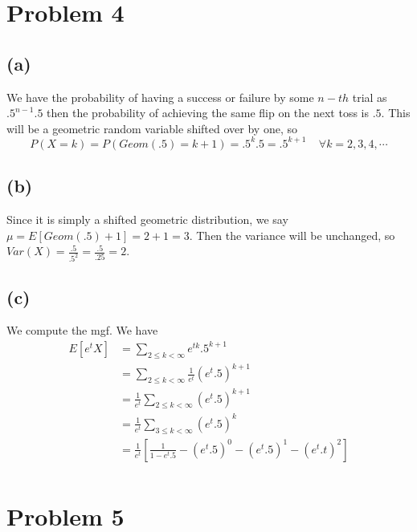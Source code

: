 \documentclass{article}
\theoremstyle{definition}
\begin{document}
\section*{Problem 4}
\subsection*{(a)}
We have the probability of having a success or failure by some $n-th$ trial as $.5^{n-1}.5$ then the probability of achieving the same flip on the next toss is $.5$. This will be a geometric random variable shifted over by one, so 
\[
    P(X = k) = P(Geom(.5) = k + 1) = .5^{k} .5 = .5^{k+1} \ \ \ \ \ \forall k = 2,3,4,\cdots
\]
\subsection*{(b)}
Since it is simply a shifted geometric distribution, we say $\mu = E[Geom(.5) + 1] = 2 + 1 = 3$.
Then the variance will be unchanged, so $Var(X) = \frac{.5}{.5^2} = \frac{.5}{.25} = 2$.
\subsection*{(c)}
We compute the mgf. We have 
\begin{align*}
    E[e^tX] &= \sum_{2 \leqslant k < \infty} e^{tk} .5^{k+1}\\
    &= \sum_{2 \leqslant k < \infty} \frac{1}{e^t} (e^t .5)^{k+1}\\
    &=  \frac{1}{e^t} \sum_{2 \leqslant k < \infty} (e^t .5)^{k+1}\\
    &=  \frac{1}{e^t} \sum_{3 \leqslant k < \infty} (e^t .5)^{k}\\
    &= \frac{1}{e^t} \left[\frac{1}{1 - e^t .5} - (e^t.5)^0 - (e^t.5)^1 - (e^t.t)^2\right]\\
\end{align*}
\section*{Problem 5}
\end{document}

